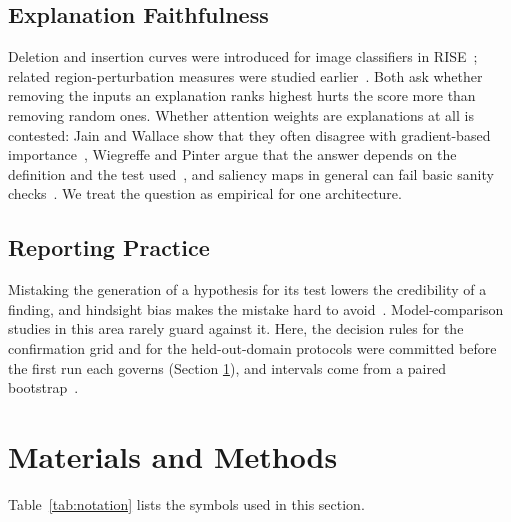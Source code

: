 \documentclass[journal]{IEEEtran}
\begin{document}
\subsection{Explanation Faithfulness}\label{sub:faith}

Deletion and insertion curves were introduced for image classifiers in RISE~\cite{rise}; related region-perturbation measures were studied earlier~\cite{samek}. Both ask whether removing the inputs an explanation ranks highest hurts the score more than removing random ones. Whether attention weights are explanations at all is contested: Jain and Wallace show that they often disagree with gradient-based importance~\cite{jain}, Wiegreffe and Pinter argue that the answer depends on the definition and the test used~\cite{wiegreffe}, and saliency maps in general can fail basic sanity checks~\cite{adebayo}. We treat the question as empirical for one architecture.


\subsection{Reporting Practice}\label{sub:report}

Mistaking the generation of a hypothesis for its test lowers the credibility of a finding, and hindsight bias makes the mistake hard to avoid~\cite{nosek}. Model-comparison studies in this area rarely guard against it. Here, the decision rules for the confirmation grid and for the held-out-domain protocols were committed before the first run each governs (Section \ref{sec:methods}), and intervals come from a paired bootstrap~\cite{efron}.


\section{Materials and Methods}\label{sec:methods}

Table~\ref{tab:notation} lists the symbols used in this section.
\end{document}
